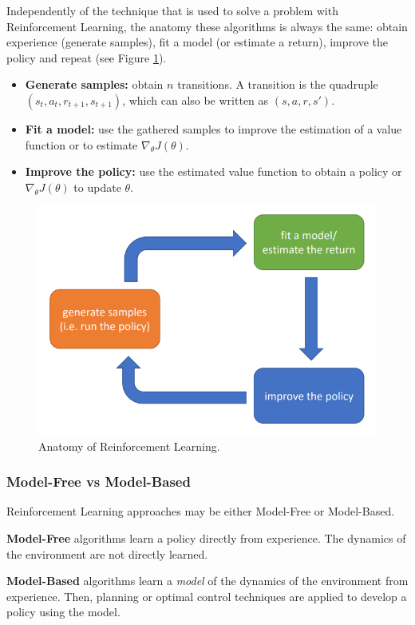 Independently of the technique that is used to solve a problem with Reinforcement Learning, the anatomy these algorithms is always the same: obtain experience (generate samples), fit a model (or estimate a return), improve the policy and repeat (see Figure \ref{fig:RL_anatomy}). 

\begin{itemize}
    \item \textbf{Generate samples:} obtain $n$ transitions. A transition is the quadruple $(s_{t}, a_{t}, r_{t+1}, s_{t+1})$, which can also be written as $(s, a, r, s')$.
    \item \textbf{Fit a model:} use the gathered samples to improve the estimation of a value function or to estimate $\nabla_{\theta} J(\theta)$.
    \item \textbf{Improve the policy:} use the estimated value function to obtain a policy or $\nabla_{\theta} J(\theta)$ to update $\theta$.
\end{itemize}

\begin{figure}[h]
    \centering
    \includegraphics[width=0.7\linewidth]{imagenes/cap1/RL_anatomy.png}
    \caption{Anatomy of Reinforcement Learning.}
    \label{fig:RL_anatomy}
\end{figure}

\subsubsection{Model-Free vs Model-Based}
Reinforcement Learning approaches may be either Model-Free or Model-Based.

\textbf{Model-Free} algorithms learn a policy directly from experience. The dynamics of the environment are not directly learned.

\textbf{Model-Based} algorithms learn a \emph{model} of the dynamics of the environment from experience. Then, planning or optimal control techniques are applied to develop a policy using the model.

